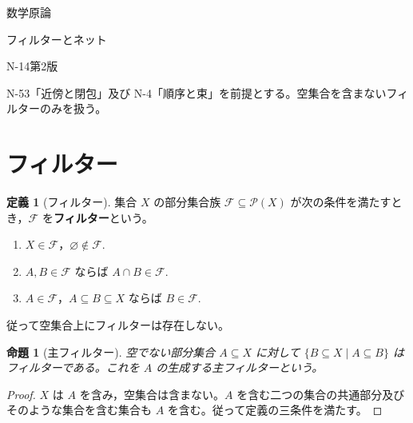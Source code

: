 \documentclass[a5paper,10pt,dvipdfmx]{jsarticle}
\theoremstyle{definition}
\newtheorem{defn}[ruledef]{定義}
\theoremstyle{plain}
\newtheorem{prop}[ruledef]{命題}
\newcommand{\Pow}{\mathcal{P}}
\begin{document}
\begin{center}
{\small 数学原論}\par\vspace{4mm}
{\LARGE フィルターとネット}\par\vspace{2mm}
{\small N-14\quad 第2版}
\end{center}
N-53「近傍と閉包」及び N-4「順序と束」を前提とする。空集合を含まないフィルターのみを扱う。
\section{フィルター}
\begin{defn}[フィルター]\label{k233}
集合 $X$ の部分集合族 $\mathcal F\subseteq\Pow(X)$ が次の条件を満たすとき，$\mathcal F$ を\textbf{フィルター}という。
\begin{enumerate}
\item $X\in\mathcal F$，$\varnothing\notin\mathcal F$.
\item $A,B\in\mathcal F$ ならば $A\cap B\in\mathcal F$.
\item $A\in\mathcal F$，$A\subseteq B\subseteq X$ ならば $B\in\mathcal F$.
\end{enumerate}
従って空集合上にフィルターは存在しない。
\end{defn}
\begin{prop}[主フィルター]\label{k234}
空でない部分集合 $A\subseteq X$ に対して $\{B\subseteq X\mid A\subseteq B\}$ はフィルターである。これを $A$ の生成する主フィルターという。
\end{prop}
\begin{proof}
$X$ は $A$ を含み，空集合は含まない。$A$ を含む二つの集合の共通部分及びそのような集合を含む集合も $A$ を含む。従って定義の三条件を満たす。
\end{proof}
\end{document}
